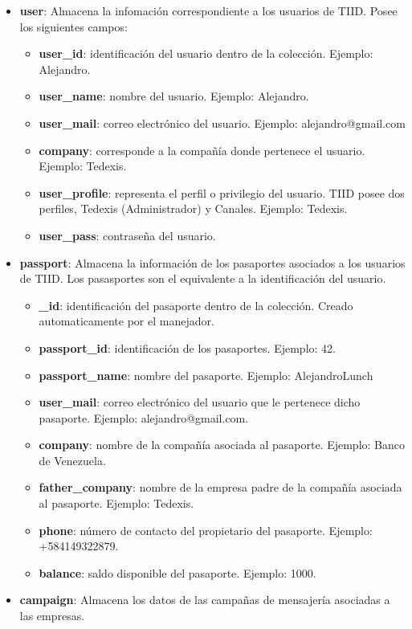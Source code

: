 \begin{itemize}[noitemsep,nolistsep]
\item \textbf{user}: Almacena la infomación correspondiente a los usuarios de TIID. Posee los siguientes campos:
\begin{itemize}[noitemsep,nolistsep]
\item \textbf{user\_id}: identificación del usuario dentro de la colección. Ejemplo: Alejandro.
\item \textbf{user\_name}: nombre del usuario. Ejemplo: Alejandro.
\item \textbf{user\_mail}: correo electrónico del usuario. Ejemplo: alejandro@gmail.com
\item \textbf{company}: corresponde a la compañía donde pertenece el usuario. Ejemplo: Tedexis.
\item \textbf{user\_profile}: representa el perfil o privilegio del usuario. TIID posee dos perfiles, Tedexis (Administrador) y Canales. Ejemplo: Tedexis.
\item \textbf{user\_pass}: contraseña del usuario.
\end{itemize} 
\item \textbf{passport}: Almacena la información de los pasaportes asociados a los usuarios de TIID. Los pasasportes son el equivalente a la identificación del usuario.\begin{itemize}[noitemsep,nolistsep]
\item \textbf{\_id}: identificación del pasaporte dentro de la colección. Creado automaticamente por el manejador.
\item \textbf{passport\_id}: identificación de los pasaportes. Ejemplo: 42.
\item \textbf{passport\_name}: nombre del pasaporte. Ejemplo: AlejandroLunch
\item \textbf{user\_mail}: correo electrónico del usuario que le pertenece dicho pasaporte. Ejemplo: alejandro@gmail.com.
\item \textbf{company}: nombre de la compañía asociada al pasaporte. Ejemplo: Banco de Venezuela.
\item \textbf{father\_company}: nombre de la empresa padre de la compañía asociada al pasaporte. Ejemplo: Tedexis.
\item \textbf{phone}: número de contacto del propietario del pasaporte. Ejemplo: +584149322879.
\item \textbf{balance}: saldo disponible del pasaporte. Ejemplo: 1000.
\end{itemize} 
\item \textbf{campaign}: Almacena los datos de las campañas de mensajería asociadas a las empresas.

\end{itemize}

